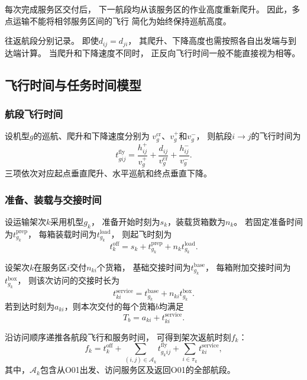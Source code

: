 \documentclass[bwprint]{gmcmthesis}
\begin{document}
每次完成服务区交付后，
下一航段均从该服务区的作业高度重新爬升。
因此，多点运输不能将相邻服务区间的飞行
简化为始终保持巡航高度。

往返航段分别记录。
即使$d_{ij}=d_{ji}$，
其爬升、下降高度也需按照各自出发端与到达端计算。
当爬升和下降速度不同时，
正反向飞行时间一般不能直接视为相等。
\subsection{飞行时间与任务时间模型}

\subsubsection{航段飞行时间}

设机型$g$的巡航、爬升和下降速度分别为
$v_g^{\mathrm{cr}}$、$v_g^{+}$和$v_g^{-}$，
则航段$i\to j$的飞行时间为
\begin{equation}
    t_{gij}^{\mathrm{fly}}
    =
    \frac{h_{ij}^{+}}{v_g^{+}}
    +
    \frac{d_{ij}}{v_g^{\mathrm{cr}}}
    +
    \frac{h_{ij}^{-}}{v_g^{-}}.
\end{equation}
三项依次对应起点垂直爬升、水平巡航和终点垂直下降。

\subsubsection{准备、装载与交接时间}

设运输架次$k$采用机型$g_k$，
准备开始时刻为$s_k$，装载货箱数为$n_k$。
若固定准备时间为$t_{g_k}^{\mathrm{prep}}$，
每箱装载时间为$t_{g_k}^{\mathrm{load}}$，
则起飞时刻为
\begin{equation}
    t_k^{\mathrm{off}}
    =
    s_k+t_{g_k}^{\mathrm{prep}}
    +n_k t_{g_k}^{\mathrm{load}}.
\end{equation}

设架次$k$在服务区$i$交付$n_{ki}$个货箱，
基础交接时间为$t_{g_k}^{\mathrm{base}}$，
每箱附加交接时间为$t_{g_k}^{\mathrm{box}}$，
则该次访问的交接时长为
\begin{equation}
    t_{ki}^{\mathrm{service}}
    =
    t_{g_k}^{\mathrm{base}}
    +n_{ki}t_{g_k}^{\mathrm{box}}.
\end{equation}
若到达时刻为$a_{ki}$，则本次交付的每个货箱$b$均满足
\begin{equation}
    T_b
    =
    a_{ki}+t_{ki}^{\mathrm{service}}.
\end{equation}

沿访问顺序递推各航段飞行和服务时间，
可得到架次返航时刻$f_k$：
\begin{equation}
    f_k
    =
    t_k^{\mathrm{off}}
    +
    \sum_{(i,j)\in\mathcal{A}_k}
    t_{g_kij}^{\mathrm{fly}}
    +
    \sum_{i\in\pi_k}
    t_{ki}^{\mathrm{service}},
\end{equation}
其中，$\mathcal{A}_k$包含从O01出发、访问服务区及返回O01的全部航段。
\end{document}
